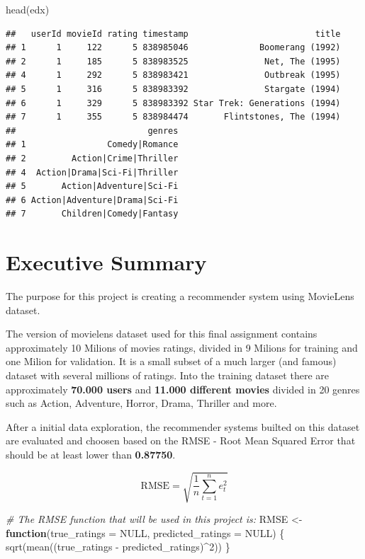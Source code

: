 \documentclass[
]{article}
\newenvironment{Shaded}{}{}
\newcommand{\AttributeTok}[1]{\textcolor[rgb]{0.49,0.56,0.16}{#1}}
\newcommand{\CommentTok}[1]{\textcolor[rgb]{0.38,0.63,0.69}{\textit{#1}}}
\newcommand{\ConstantTok}[1]{\textcolor[rgb]{0.53,0.00,0.00}{#1}}
\newcommand{\ControlFlowTok}[1]{\textcolor[rgb]{0.00,0.44,0.13}{\textbf{#1}}}
\newcommand{\DecValTok}[1]{\textcolor[rgb]{0.25,0.63,0.44}{#1}}
\newcommand{\FunctionTok}[1]{\textcolor[rgb]{0.02,0.16,0.49}{#1}}
\newcommand{\NormalTok}[1]{#1}
\newcommand{\OtherTok}[1]{\textcolor[rgb]{0.00,0.44,0.13}{#1}}
\newcommand{\SpecialCharTok}[1]{\textcolor[rgb]{0.25,0.44,0.63}{#1}}
\begin{document}
\begin{Shaded}
\begin{Highlighting}[]
\FunctionTok{head}\NormalTok{(edx)}
\end{Highlighting}
\end{Shaded}

\begin{verbatim}
##   userId movieId rating timestamp                         title
## 1      1     122      5 838985046              Boomerang (1992)
## 2      1     185      5 838983525               Net, The (1995)
## 4      1     292      5 838983421               Outbreak (1995)
## 5      1     316      5 838983392               Stargate (1994)
## 6      1     329      5 838983392 Star Trek: Generations (1994)
## 7      1     355      5 838984474       Flintstones, The (1994)
##                          genres
## 1                Comedy|Romance
## 2         Action|Crime|Thriller
## 4  Action|Drama|Sci-Fi|Thriller
## 5       Action|Adventure|Sci-Fi
## 6 Action|Adventure|Drama|Sci-Fi
## 7       Children|Comedy|Fantasy
\end{verbatim}

\newpage

\hypertarget{executive-summary}{%
\section{Executive Summary}\label{executive-summary}}

The purpose for this project is creating a recommender system using
MovieLens dataset.

The version of movielens dataset used for this final assignment contains
approximately 10 Milions of movies ratings, divided in 9 Milions for
training and one Milion for validation. It is a small subset of a much
larger (and famous) dataset with several millions of ratings. Into the
training dataset there are approximately \textbf{70.000 users} and
\textbf{11.000 different movies} divided in 20 genres such as Action,
Adventure, Horror, Drama, Thriller and more.

After a initial data exploration, the recommender systems builted on
this dataset are evaluated and choosen based on the RMSE - Root Mean
Squared Error that should be at least lower than \textbf{0.87750}.

\[\mbox{RMSE} = \sqrt{\frac{1}{n}\sum_{t=1}^{n}e_t^2}\]

\begin{Shaded}
\begin{Highlighting}[]
\CommentTok{\# The RMSE function that will be used in this project is:}
\NormalTok{RMSE }\OtherTok{\textless{}{-}} \ControlFlowTok{function}\NormalTok{(}\AttributeTok{true\_ratings =} \ConstantTok{NULL}\NormalTok{, }\AttributeTok{predicted\_ratings =} \ConstantTok{NULL}\NormalTok{) \{}
    \FunctionTok{sqrt}\NormalTok{(}\FunctionTok{mean}\NormalTok{((true\_ratings }\SpecialCharTok{{-}}\NormalTok{ predicted\_ratings)}\SpecialCharTok{\^{}}\DecValTok{2}\NormalTok{))}
\NormalTok{\}}
\end{Highlighting}
\end{Shaded}
\end{document}
